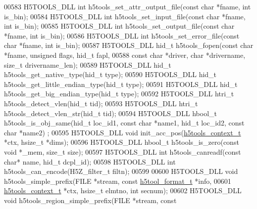 \begin{DoxyCode}
{{{{{{{{{{{{{{{{{{{00583 H5TOOLS\_DLL \textcolor{keywordtype}{int}     h5tools\_set\_attr\_output\_file(\textcolor{keyword}{const} \textcolor{keywordtype}{char} *fname, \textcolor{keywordtype}{int} is\_bin);
00584 H5TOOLS\_DLL \textcolor{keywordtype}{int}     h5tools\_set\_input\_file(\textcolor{keyword}{const} \textcolor{keywordtype}{char} *fname, \textcolor{keywordtype}{int} is\_bin);
00585 H5TOOLS\_DLL \textcolor{keywordtype}{int}     h5tools\_set\_output\_file(\textcolor{keyword}{const} \textcolor{keywordtype}{char} *fname, \textcolor{keywordtype}{int} is\_bin);
00586 H5TOOLS\_DLL \textcolor{keywordtype}{int}     h5tools\_set\_error\_file(\textcolor{keyword}{const} \textcolor{keywordtype}{char} *fname, \textcolor{keywordtype}{int} is\_bin);
00587 H5TOOLS\_DLL hid\_t   h5tools\_fopen(\textcolor{keyword}{const} \textcolor{keywordtype}{char} *fname, \textcolor{keywordtype}{unsigned} flags, hid\_t fapl,
00588                             \textcolor{keyword}{const} \textcolor{keywordtype}{char} *driver, \textcolor{keywordtype}{char} *drivername, \textcolor{keywordtype}{size\_t} drivername\_len);
00589 H5TOOLS\_DLL hid\_t   h5tools\_get\_native\_type(hid\_t type);
00590 H5TOOLS\_DLL hid\_t   h5tools\_get\_little\_endian\_type(hid\_t type);
00591 H5TOOLS\_DLL hid\_t   h5tools\_get\_big\_endian\_type(hid\_t type);
00592 H5TOOLS\_DLL htri\_t  h5tools\_detect\_vlen(hid\_t tid);
00593 H5TOOLS\_DLL htri\_t  h5tools\_detect\_vlen\_str(hid\_t tid);
00594 H5TOOLS\_DLL hbool\_t h5tools\_is\_obj\_same(hid\_t loc\_id1, \textcolor{keyword}{const} \textcolor{keywordtype}{char} *name1, hid\_t loc\_id2, \textcolor{keyword}{const} \textcolor{keywordtype}{char} *name2)
      ;
00595 H5TOOLS\_DLL \textcolor{keywordtype}{void}    init\_acc\_pos(\hyperlink{structh5tools__context__t}{h5tools\_context\_t} *ctx, hsize\_t *dims);
00596 H5TOOLS\_DLL hbool\_t h5tools\_is\_zero(\textcolor{keyword}{const} \textcolor{keywordtype}{void} *\_mem, \textcolor{keywordtype}{size\_t} size);
00597 H5TOOLS\_DLL \textcolor{keywordtype}{int}     h5tools\_canreadf(\textcolor{keyword}{const} \textcolor{keywordtype}{char}* name,  hid\_t dcpl\_id);
00598 H5TOOLS\_DLL \textcolor{keywordtype}{int}     h5tools\_can\_encode(H5Z\_filter\_t filtn);
00599 
00600 H5TOOLS\_DLL \textcolor{keywordtype}{void}    h5tools\_simple\_prefix(FILE *stream, \textcolor{keyword}{const} \hyperlink{structh5tool__format__t}{h5tool\_format\_t} *info,
00601                             \hyperlink{structh5tools__context__t}{h5tools\_context\_t} *ctx, hsize\_t elmtno, \textcolor{keywordtype}{int} secnum);
00602 H5TOOLS\_DLL \textcolor{keywordtype}{void}    h5tools\_region\_simple\_prefix(FILE *stream, \textcolor{keyword}{const} 
}}}}}}}}}}}}}}}}}}}
\end{DoxyCode}
